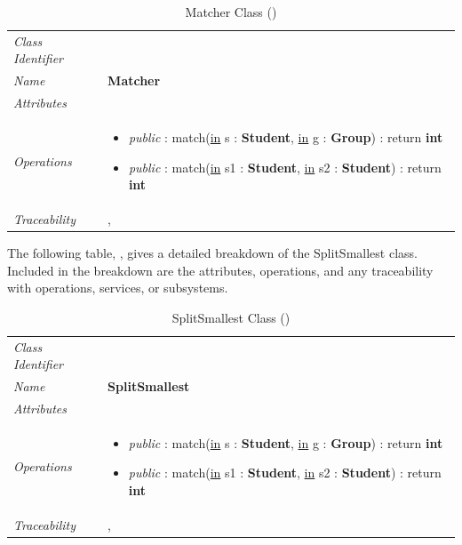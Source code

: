 \documentclass[12pt,letterpaper]{article}
\begin{document}
\begin{table}[H]
    \caption{Matcher Class ()} 
	\begin{tabu} to 
		\toprule
		Class Identifier &  \\
		Name & {\bf Matcher} \\
		Attributes & \\

		Operations &
		\begin{minipage}[t]{\linewidth}
			\begin{itemize}
			    \item {\it public} : match(\underline{in} s : {\bf Student}, \underline{in} g : {\bf Group}) : return {\bf int}
			    \item {\it public} : match(\underline{in} s1 : {\bf Student}, \underline{in} s2 : {\bf Student}) : return {\bf int}
	        \end{itemize}
	    \end{minipage} \\
	    	Traceability & , \\
		\toprule
	\end{tabu}
\end{table}

The following table, , gives a detailed breakdown of the SplitSmallest class. Included in the breakdown are the attributes, operations, and any traceability with operations, services, or subsystems.

\begin{table}[H]
    \caption{SplitSmallest Class ()} 
	\begin{tabu} to 
		\toprule
		Class Identifier &  \\
		Name & {\bf SplitSmallest} \\
		Attributes & \\

		Operations &
		\begin{minipage}[t]{\linewidth}
			\begin{itemize}
			    \item {\it public} : match(\underline{in} s : {\bf Student}, \underline{in} g : {\bf Group}) : return {\bf int}
			    \item {\it public} : match(\underline{in} s1 : {\bf Student}, \underline{in} s2 : {\bf Student}) : return {\bf int}
	        \end{itemize}
	    \end{minipage} \\
	    	Traceability & , \\
		\toprule
	\end{tabu}
\end{table}
\end{document}
